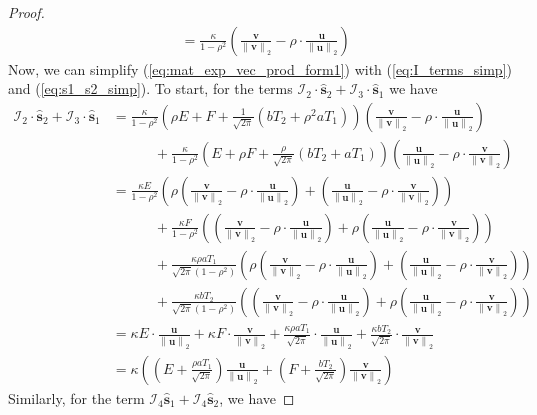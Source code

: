 \documentclass[10pt,a4paper]{amsart}
\def\bfs{{\mathbf{s}}}\def\bft{{\mathbf{t}}}
\def\bfu{{\mathbf{u}}}\def\bfv{{\mathbf{v}}}\def\bfw{{\mathbf{w}}}\def\bfx{{\mathbf{x}}}
\def\bfv{{\mathbf{v}}}\def\bfw{{\mathbf{w}}}\def\bfx{{\mathbf{x}}}
\newcommand{\norm}[1]{\left\|#1\right\|}
\newcommand{\paren}[1]{\left(#1\right)}
\begin{document}
\begin{proof}
\begin{equation}
\begin{aligned}
            & = \frac{\kappa}{1-\rho^2}\paren{\frac{\bfv}{\norm{\bfv}_2} - \rho\cdot\frac{\bfu}{\norm{\bfu}_2}}
        \end{aligned}
    \end{equation}
    Now, we can simplify (\ref{eq:mat_exp_vec_prod_form1}) with (\ref{eq:I_terms_simp}) and (\ref{eq:s1_s2_simp}). To start, for the terms $\mathcal{I}_2\cdot\hat{\bfs}_2 + \mathcal{I}_3\cdot\hat{\bfs}_1$ we have
    \begin{align*}
        \mathcal{I}_2\cdot\hat{\bfs}_2 + \mathcal{I}_3\cdot\hat{\bfs}_1 & = \frac{\kappa}{1-\rho^2}\paren{\rho E + F + \frac{1}{\sqrt{2\pi}}\paren{bT_2 + \rho^2aT_1}}\paren{\frac{\bfv}{\norm{\bfv}_2} - \rho\cdot\frac{\bfu}{\norm{\bfu}_2}}\\
        &\quad\quad\quad + \frac{\kappa}{1-\rho^2}\paren{E + \rho F + \frac{\rho}{\sqrt{2\pi}}\paren{bT_2 + aT_1}}\paren{\frac{\bfu}{\norm{\bfu}_2} - \rho\cdot \frac{\bfv}{\norm{\bfv}_2}}\\
        & = \frac{\kappa E}{1-\rho^2}\paren{\rho\paren{\frac{\bfv}{\norm{\bfv}_2} - \rho\cdot\frac{\bfu}{\norm{\bfu}_2}} + \paren{\frac{\bfu}{\norm{\bfu}_2} - \rho\cdot \frac{\bfv}{\norm{\bfv}_2}}}\\
        &\quad\quad\quad + \frac{\kappa F}{1-\rho^2}\paren{\paren{\frac{\bfv}{\norm{\bfv}_2} - \rho\cdot\frac{\bfu}{\norm{\bfu}_2}} + \rho\paren{\frac{\bfu}{\norm{\bfu}_2} - \rho\cdot \frac{\bfv}{\norm{\bfv}_2}}}\\
        & \quad\quad\quad + \frac{\kappa\rho aT_1}{\sqrt{2\pi}\paren{1-\rho^2}}\paren{\rho\paren{\frac{\bfv}{\norm{\bfv}_2} - \rho\cdot\frac{\bfu}{\norm{\bfu}_2}} + \paren{\frac{\bfu}{\norm{\bfu}_2} - \rho\cdot \frac{\bfv}{\norm{\bfv}_2}}}\\
        &\quad\quad\quad + \frac{\kappa b T_2}{\sqrt{2\pi}\paren{1-\rho^2}}\paren{\paren{\frac{\bfv}{\norm{\bfv}_2} - \rho\cdot\frac{\bfu}{\norm{\bfu}_2}} + \rho\paren{\frac{\bfu}{\norm{\bfu}_2} - \rho\cdot \frac{\bfv}{\norm{\bfv}_2}}}\\
        & = \kappa E\cdot\frac{\bfu}{\norm{\bfu}_2} + \kappa F\cdot\frac{\bfv}{\norm{\bfv}_2} + \frac{\kappa\rho a T_1}{\sqrt{2\pi}}\cdot\frac{\bfu}{\norm{\bfu}_2} + \frac{\kappa b T_2}{\sqrt{2\pi}}\cdot\frac{\bfv}{\norm{\bfv}_2}\\
        & = \kappa\paren{\paren{E + \frac{\rho a T_1}{\sqrt{2\pi}}}\frac{\bfu}{\norm{\bfu}_2} + \paren{F + \frac{b T_2}{\sqrt{2\pi}}}\frac{\bfv}{\norm{\bfv}_2}}
    \end{align*}
    Similarly, for the term $\mathcal{I}_4\hat{\bfs}_1 + \mathcal{I}_4\hat{\bfs}_2$, we have

\end{proof}
\end{document}
